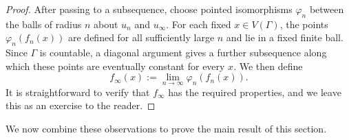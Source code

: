 \documentclass[10pt,a4paper]{amsart}
\theoremstyle{definition}
\begin{document}
\begin{proof}
After passing to a subsequence, choose pointed isomorphisms $\varphi_n$ between the balls of radius $n$ about $u_n$ and $u_\infty$. For each fixed $x\in V(\Gamma)$, the points $\varphi_n(f_n(x))$ are defined for all sufficiently large $n$ and lie in a fixed finite ball. Since $\Gamma$ is countable, a diagonal argument gives a further subsequence along which these points are eventually constant for every $x$. We then define
$$
f_\infty(x):=\lim_{n\to\infty}\varphi_n(f_n(x)).
$$
It is straightforward to verify that $f_\infty$ has the required properties, and we leave this as an exercise to the reader. 
\end{proof}



We now combine these observations to prove the main result of this section. 
\end{document}

